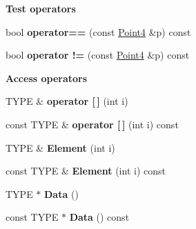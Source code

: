\begin{Indent}\textbf{ Test operators}\par
\begin{DoxyCompactItemize}
\item 
\mbox{\label{classcy_1_1_point4_a0a08566027408bd3709ccd833191851c}} 
bool {\bfseries operator==} (const \mbox{\hyperlink{classcy_1_1_point4}{Point4}} \&p) const
\item 
\mbox{\label{classcy_1_1_point4_af4bfc8cc28da731e4b54c1daa3c7d931}} 
bool {\bfseries operator !=} (const \mbox{\hyperlink{classcy_1_1_point4}{Point4}} \&p) const
\end{DoxyCompactItemize}
\end{Indent}
\begin{Indent}\textbf{ Access operators}\par
\begin{DoxyCompactItemize}
\item 
\mbox{\label{classcy_1_1_point4_a028bf21b88f60d8ec9dfa45057cf2fd4}} 
T\+Y\+PE \& {\bfseries operator \mbox{[}$\,$\mbox{]}} (int i)
\item 
\mbox{\label{classcy_1_1_point4_aeb76cc8c5ab9816a5e1a9eb3684b1eaa}} 
const T\+Y\+PE \& {\bfseries operator \mbox{[}$\,$\mbox{]}} (int i) const
\item 
\mbox{\label{classcy_1_1_point4_a6a8e22fe5e291106ed445e9a8de22598}} 
T\+Y\+PE \& {\bfseries Element} (int i)
\item 
\mbox{\label{classcy_1_1_point4_a4ba9f7ee9db1a40c60484192499259e7}} 
const T\+Y\+PE \& {\bfseries Element} (int i) const
\item 
\mbox{\label{classcy_1_1_point4_abc6b7bfb6e38eac29243f0fbe4b369b1}} 
T\+Y\+PE $\ast$ {\bfseries Data} ()
\item 
\mbox{\label{classcy_1_1_point4_a1d17ef63c2000347132ebce671c0fefa}} 
const T\+Y\+PE $\ast$ {\bfseries Data} () const
\end{DoxyCompactItemize}
\end{Indent}
